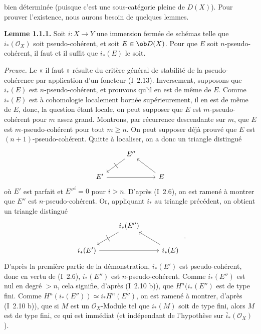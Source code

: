 bien déterminée (puisque c'est une sous-catégorie pleine de \(D(X)\)). Pour prouver l'existence, nous aurons besoin de quelques lemmes.

\textbf{Lemme 1.1.1.} Soit \(i:X\to Y\) une immersion fermée de schémas telle que \(i_*(\mathcal O_X)\) soit pseudo-cohérent, et soit \(E\in\ob D(X)\). Pour que \(E\) soit \(n\)-pseudo-cohérent, il faut et il suffit que \(i_*(E)\) le soit.

\emph{Preuve.} Le « il faut » résulte du critère général de stabilité de la pseudo-cohérence par application d'un foncteur (I~2.13). Inversement, supposons que \(i_*(E)\) est \(n\)-pseudo-cohérent, et prouvons qu'il en est de même de \(E\). Comme \(i_*(E)\) est à cohomologie localement bornée supérieurement, il en est de même de \(E\), donc, la question étant locale, on peut supposer que \(E\) est \(m\)-pseudo-cohérent pour \(m\) assez grand. Montrons, par récurrence descendante sur \(m\), que \(E\) est \(m\)-pseudo-cohérent pour tout \(m\geq n\). On peut supposer déjà prouvé que \(E\) est \((n+1)\)-pseudo-cohérent. Quitte à localiser, on a donc un triangle distingué
\[
\begin{tikzcd}
& E'' \arrow[dl,"|" marking] & \\
E' \arrow[rr] & & E \arrow[ul]
\end{tikzcd}
\]
où \(E'\) est parfait et \(E''^i=0\) pour \(i>n\). D'après (I~2.6), on est ramené à montrer que \(E''\) est \(n\)-pseudo-cohérent. Or, appliquant \(i_*\) au triangle précédent, on obtient un triangle distingué
\[
\begin{tikzcd}
& i_*(E'') \arrow[dl,"|" marking] & \\
i_*(E') \arrow[rr] & & i_*(E) \arrow[ul]
\end{tikzcd}\ .
\]
D'après la première partie de la démonstration, \(i_*(E')\) est pseudo-cohérent, donc en vertu de (I~2.6), \(i_*(E'')\) est \(n\)-pseudo-cohérent. Comme \(i_*(E'')\) est nul en degré \(>n\), cela signifie, d'après (I~2.10 b)), que \(H^n(i_*(E'')\) est de type fini. Comme \(H^n(i_*(E''))\simeq i_*H^n(E'')\), on est ramené à montrer, d'après (I~2.10 b)), que si \(M\) est un \(\mathcal O_X\)-Module tel que \(i_*(M)\) soit de type fini, alors \(M\) est de type fini, ce qui est immédiat (et indépendant de l'hypothèse sur \(\bar i_*(\mathcal O_X)\)).

